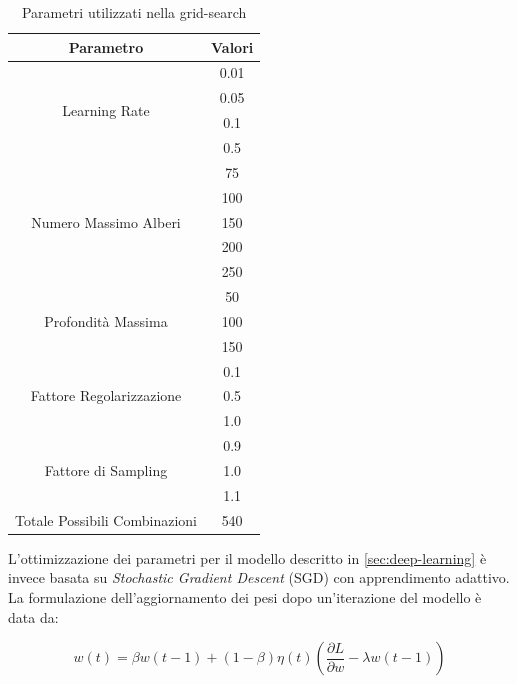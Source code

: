 \begin{table}
    \begin{tabular}[h]{||c|c||}
    \hline
    \textbf{Parametro} & \textbf{Valori} \\
    \hline
    \hline
    \multirow{4}{*}{Learning Rate} & 0.01 \\
    & 0.05 \\
    & 0.1 \\
    & 0.5 \\
    \hline
    \multirow{5}{*}{Numero Massimo Alberi} & 75 \\
    & 100 \\
    & 150 \\
    & 200 \\
    & 250 \\
    \hline
    \multirow{3}{*}{Profondità Massima} & 50 \\
    & 100 \\
    & 150 \\
    \hline
    \multirow{3}{*}{Fattore Regolarizzazione} & 0.1 \\
    & 0.5 \\
    & 1.0 \\
    \hline
    \multirow{3}{*}{Fattore di Sampling} & 0.9 \\
    & 1.0 \\
    & 1.1 \\
    \hline
    \hline
    Totale Possibili Combinazioni & 540 \\
    \hline
    \end{tabular}
    \caption{\label{tab:grid-search}Parametri utilizzati nella grid-search}
\end{table}

L'ottimizzazione dei parametri per il modello descritto in
\ref{sec:deep-learning} è invece basata su {\it Stochastic
Gradient Descent} (SGD) con apprendimento adattivo.
La formulazione dell'aggiornamento dei pesi dopo
un'iterazione del modello è data da:

\begin{equation}
    w(t) = \beta w(t-1) + (1-\beta) \eta(t)(\frac{\partial L}{\partial w}-\lambda w(t-1))
    \label{eq:sgd}
\end{equation}

